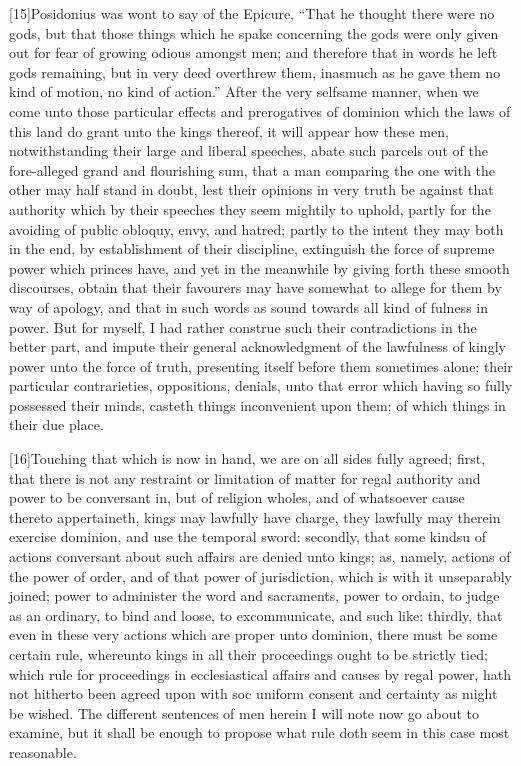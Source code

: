 [15]Posidonius was wont to say of the Epicure, “That he thought there were no gods, but that those things which he spake concerning the gods were only given out for fear of growing odious amongst men; and therefore that in words he left gods remaining, but in very deed overthrew them, inasmuch as he gave them no kind of motion, no kind of action.” After the very selfsame manner, when we come  unto those particular effects and prerogatives of dominion which the laws of this land do grant unto the kings thereof, it will appear how these men, notwithstanding their large and liberal speeches, abate such parcels out of the fore-alleged grand and flourishing sum, that a man comparing the one with the other may half stand in doubt, lest their opinions in very truth be against that authority which by their speeches they seem mightily to uphold, partly for the avoiding of public obloquy, envy, and hatred; partly to the intent they may both in the end, by establishment of their discipline, extinguish the force of supreme power which princes have, and yet in the meanwhile by giving forth these smooth discourses, obtain that their favourers may have somewhat to allege for them by way of apology, and that in such words as sound towards all kind of fulness in power. But for myself, I had rather construe such their contradictions in the better part, and impute their general acknowledgment of the lawfulness of kingly power unto the force of truth, presenting itself before them sometimes alone; their particular contrarieties, oppositions, denials, unto that error which having so fully possessed their minds, casteth things inconvenient upon them; of which things in their due place.

[16]Touching that which is now in hand, we are on all sides fully agreed; first, that there is not any restraint or limitation of matter for regal authority and power to be conversant in, but of religion wholes, and of whatsoever cause thereto appertaineth, kings may lawfully have charge, they lawfully may therein exercise dominion, and use the temporal sword: secondly, that some kindsu of actions conversant about such affairs are denied unto kings; as, namely, actions of the power  of order, and of that power of jurisdiction, which is with it unseparably joined; power to administer the word and sacraments, power to ordain, to judge as an ordinary, to bind and loose, to excommunicate, and such like: thirdly, that even in these very actions which are proper unto dominion, there must be some certain rule, whereunto kings in all their proceedings ought to be strictly tied; which rule for proceedings in ecclesiastical affairs and causes by regal power, hath not hitherto been agreed upon with soc uniform consent and certainty as might be wished. The different sentences of men herein I will note now go about to examine, but it shall be enough to propose what rule doth seem in this case most reasonable.

